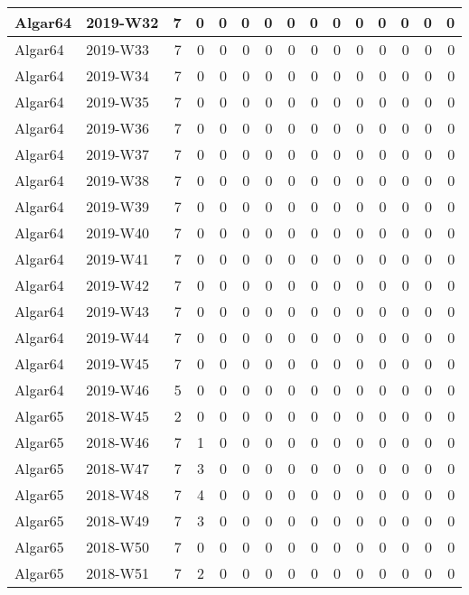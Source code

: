 \documentclass[]{book}
\begin{document}
\begin{table}
\begin{tabular}[t]{l|l|r|r|r|r|r|r|r|r|r|r|r|r|r}
\hline
Algar64 & 2019-W32 & 7 & 0 & 0 & 0 & 0 & 0 & 0 & 0 & 0 & 0 & 0 & 0 & 0\\
\hline
Algar64 & 2019-W33 & 7 & 0 & 0 & 0 & 0 & 0 & 0 & 0 & 0 & 0 & 0 & 0 & 0\\
\hline
Algar64 & 2019-W34 & 7 & 0 & 0 & 0 & 0 & 0 & 0 & 0 & 0 & 0 & 0 & 0 & 0\\
\hline
Algar64 & 2019-W35 & 7 & 0 & 0 & 0 & 0 & 0 & 0 & 0 & 0 & 0 & 0 & 0 & 0\\
\hline
Algar64 & 2019-W36 & 7 & 0 & 0 & 0 & 0 & 0 & 0 & 0 & 0 & 0 & 0 & 0 & 0\\
\hline
Algar64 & 2019-W37 & 7 & 0 & 0 & 0 & 0 & 0 & 0 & 0 & 0 & 0 & 0 & 0 & 0\\
\hline
Algar64 & 2019-W38 & 7 & 0 & 0 & 0 & 0 & 0 & 0 & 0 & 0 & 0 & 0 & 0 & 0\\
\hline
Algar64 & 2019-W39 & 7 & 0 & 0 & 0 & 0 & 0 & 0 & 0 & 0 & 0 & 0 & 0 & 0\\
\hline
Algar64 & 2019-W40 & 7 & 0 & 0 & 0 & 0 & 0 & 0 & 0 & 0 & 0 & 0 & 0 & 0\\
\hline
Algar64 & 2019-W41 & 7 & 0 & 0 & 0 & 0 & 0 & 0 & 0 & 0 & 0 & 0 & 0 & 0\\
\hline
Algar64 & 2019-W42 & 7 & 0 & 0 & 0 & 0 & 0 & 0 & 0 & 0 & 0 & 0 & 0 & 0\\
\hline
Algar64 & 2019-W43 & 7 & 0 & 0 & 0 & 0 & 0 & 0 & 0 & 0 & 0 & 0 & 0 & 0\\
\hline
Algar64 & 2019-W44 & 7 & 0 & 0 & 0 & 0 & 0 & 0 & 0 & 0 & 0 & 0 & 0 & 0\\
\hline
Algar64 & 2019-W45 & 7 & 0 & 0 & 0 & 0 & 0 & 0 & 0 & 0 & 0 & 0 & 0 & 0\\
\hline
Algar64 & 2019-W46 & 5 & 0 & 0 & 0 & 0 & 0 & 0 & 0 & 0 & 0 & 0 & 0 & 0\\
\hline
Algar65 & 2018-W45 & 2 & 0 & 0 & 0 & 0 & 0 & 0 & 0 & 0 & 0 & 0 & 0 & 0\\
\hline
Algar65 & 2018-W46 & 7 & 1 & 0 & 0 & 0 & 0 & 0 & 0 & 0 & 0 & 0 & 0 & 0\\
\hline
Algar65 & 2018-W47 & 7 & 3 & 0 & 0 & 0 & 0 & 0 & 0 & 0 & 0 & 0 & 0 & 0\\
\hline
Algar65 & 2018-W48 & 7 & 4 & 0 & 0 & 0 & 0 & 0 & 0 & 0 & 0 & 0 & 0 & 0\\
\hline
Algar65 & 2018-W49 & 7 & 3 & 0 & 0 & 0 & 0 & 0 & 0 & 0 & 0 & 0 & 0 & 0\\
\hline
Algar65 & 2018-W50 & 7 & 0 & 0 & 0 & 0 & 0 & 0 & 0 & 0 & 0 & 0 & 0 & 0\\
\hline
Algar65 & 2018-W51 & 7 & 2 & 0 & 0 & 0 & 0 & 0 & 0 & 0 & 0 & 0 & 0 & 0\\

\end{tabular}
\end{table}
\end{document}
